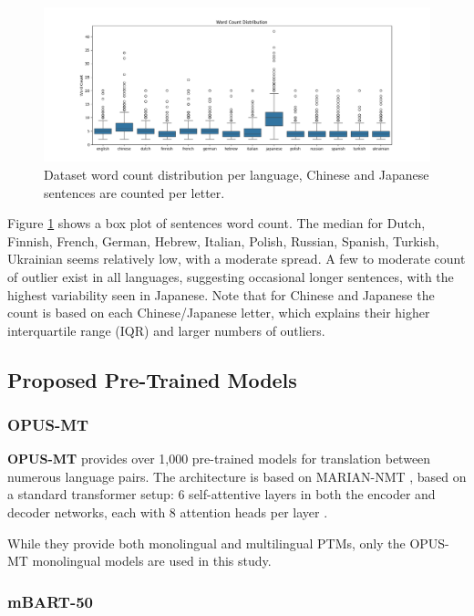 \documentclass[a4paper]{article}
\begin{document}
\begin{figure}[htbp]
    \centering
    \includegraphics[width=1\linewidth]{figures/word_count_box.png}
    \caption{Dataset word count distribution per language, Chinese and Japanese sentences are counted per letter.}
    \label{fig:word_count_box}
\end{figure}

Figure \ref{fig:word_count_box} shows a box plot of sentences word count. The median for Dutch, Finnish, French, German, Hebrew, Italian, Polish, Russian, Spanish, Turkish, Ukrainian seems relatively low, with a moderate spread. A few to moderate count of outlier exist in all languages, suggesting occasional longer sentences, with the highest variability seen in Japanese. Note that for Chinese and Japanese the count is based on each Chinese/Japanese letter, which explains their higher interquartile range (IQR) and larger numbers of outliers.

\subsection{Proposed Pre-Trained Models}

\subsubsection{OPUS-MT}

\textbf{OPUS-MT} \cite{tiedemann-2023-democratizing,tiedemann-2020-opus-mt} provides over 1,000 pre-trained models for translation between numerous language pairs. The architecture is based on MARIAN-NMT \cite{mariannmt}, based on a standard transformer setup: 6 self-attentive layers in both the encoder and decoder networks, each with 8 attention heads per layer \cite{tiedemann-2020-opus-mt}.

While they provide both monolingual and multilingual PTMs, only the OPUS-MT monolingual models are used in this study.

\subsubsection{mBART-50}
\end{document}

